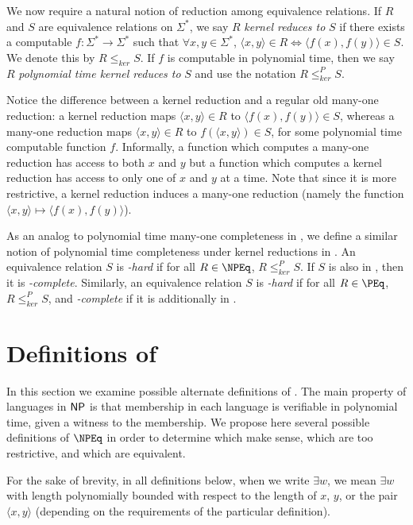 \documentclass[draft]{article}
\theoremstyle{definition} \newtheorem{openproblem}[openproblem]{Open problem}
\theoremstyle{definition} \newtheorem{definition}[definition]{Definition}
\theoremstyle{remark} \newtheorem{remark}{Remark}
\newcommand{\kr}{\leq^{P}_{ker}} %
\newcommand{\krnt}{\leq_{ker}} %
\newcommand{\defn}[1]{\emph{#1}} %
\newcommand{\pair}[2]{\langle#1,#2\rangle} %
\begin{document}
We now require a natural notion of reduction among equivalence relations.
If $R$ and $S$ are equivalence relations on $\Sigma^*$, we say $R$ \defn{kernel reduces to} $S$ if there exists a computable $f\colon\Sigma^*\to\Sigma^*$ such that $\forall x,y\in\Sigma^*$, $\pair{x}{y}\in R\iff \pair{f(x)}{f(y)}\in S$.
We denote this by $R\krnt S$.
If $f$ is computable in polynomial time, then we say $R$ \defn{polynomial time kernel reduces to} $S$ and use the notation $R\kr S$.

Notice the difference between a kernel reduction and a regular old many-one reduction: a kernel reduction maps $\pair{x}{y}\in R$ to $\pair{f(x)}{f(y)}\in S$, whereas a many-one reduction maps $\pair{x}{y}\in R$ to $f(\pair{x}{y})\in S$, for some polynomial time computable function $f$.
Informally, a function which computes a many-one reduction has access to both $x$ and $y$ but a function which computes a kernel reduction has access to only one of $x$ and $y$ at a time.
Note that since it is more restrictive, a kernel reduction induces a many-one reduction (namely the function $\pair{x}{y}\mapsto\pair{f(x)}{f(y)}$).

As an analog to polynomial time many-one completeness in \NP, we define a similar notion of polynomial time completeness under kernel reductions in \NPEq.
An equivalence relation $S$ is \defn{\NPEq-hard} if for all $R\in\NPEq$, $R\kr S$.
If $S$ is also in \NPEq, then it is \defn{\NPEq-complete}.
Similarly, an equivalence relation $S$ is \defn{\PEq-hard} if for all $R\in\PEq$, $R\kr S$, and \defn{\PEq-complete} if it is additionally in \PEq.

\section{Definitions of \texorpdfstring{\NPEq}{NPEq}}\label{sec:definitions}

In this section we examine possible alternate definitions of \NPEq.
The main property of languages in ${\mathsf{NP}}$ is that membership in each language is verifiable in polynomial time, given a witness to the membership.
We propose here several possible definitions of $\NPEq$ in order to determine which make sense, which are too restrictive, and which are equivalent.

For the sake of brevity, in all definitions below, when we write $\exists w$, we mean $\exists w$ with length polynomially bounded with respect to the length of $x$, $y$, or the pair $\pair{x}{y}$ (depending on the requirements of the particular definition).
\end{document}
